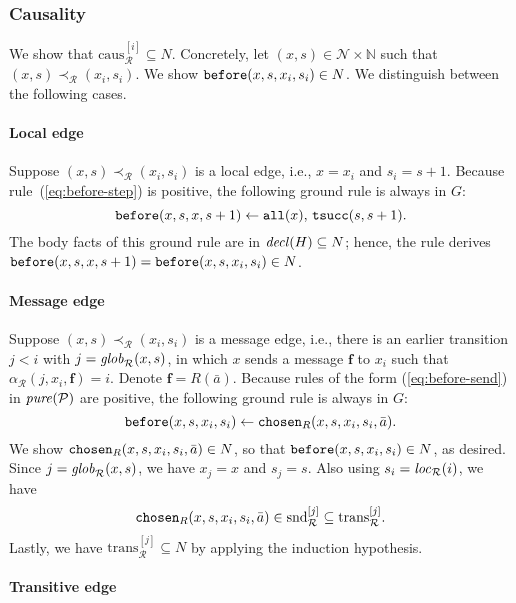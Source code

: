 \documentclass{tlp}
\newcommand{\Nat}{\mathbb{N}}  \newcommand{\len}[1]{|#1|} \newcommand{\rom}[1]{\text{\emph{(#1)}}} \newcommand{\romI}{\rom i}
\newcommand{\ded}{\mathcal{P}}
\newcommand{\fc}{\boldsymbol{f}}
\newcommand{\nw}{\mathcal{N}}
\newcommand{\timesucc}{\pred{tsucc}}
\newcommand{\relall}{\pred{all}}
\newcommand{\before}{\pred{before}}
\newcommand{\chosen}{\pred{chosen}}
\newcommand{\decl}[1]{\fname{decl}(#1)}
\newcommand{\pure}[1]{\fname{pure}(#1)}
\newcommand{\run}{\mathcal{R}}
\newcommand{\locR}[1]{\fname{loc}_{\run}(#1)}
\newcommand{\globR}[1]{\fname{glob}_{\run}(#1)}
\newcommand{\nwnat}{\nw\times\Nat}
\newcommand{\arr}{\alpha_{\run}}
\newcommand{\slice}[1]{\mathrm{trans}_{\run}^{[#1]}}
\newcommand{\slicesnd}[1]{\text{snd}_{\run}^{[#1]}}
\newcommand{\slicecaus}[1]{\text{caus}_{\run}^{[#1]}}
\newcommand{\caus}{\prec_{\run}}
\newcommand{\grded}{G}
\begin{document}
\begin{appendix}
\subsubsection{Causality}

We show that $\slicecaus i\subseteq N$. Concretely, let $(x,s)\in\nwnat$
such that $(x,s)\caus(x_{i},s_{i})$. We show $\before(x,s,x_{i},s_{i})\in N$.
We distinguish between the following cases.


\paragraph*{Local edge}

Suppose $(x,s)\caus(x_{i},s_{i})$ is a local edge, i.e., $x=x_{i}$
and $s_{i}=s+1$. Because rule~(\ref{eq:before-step}) is positive,
the following ground rule is always in $\grded$:
\[
\before(x,s,x,s+1)\gets\relall(x),\,\timesucc(s,s+1).
\]
The body facts of this ground rule are in $\decl H\subseteq N$; hence,
the rule derives $\before(x,s,x,s+1)=\before(x,s,x_{i},s_{i})\in N$.


\paragraph*{Message edge}

Suppose $(x,s)\caus(x_{i},s_{i})$ is a message edge, i.e., there
is an earlier transition $j<i$ with $j=\globR{x,s}$, in which $x$
sends a message $\fc$ to $x_{i}$ such that $\arr(j,x_{i},\fc)=i$.
Denote $\fc=R(\bar{a})$. Because rules of the form (\ref{eq:before-send})
in $\pure{\ded}$ are positive, the following ground rule is always
in $\grded$:
\[
\before(x,s,x_{i},s_{i})\gets\chosen_{R}(x,s,x_{i},s_{i},\bar{a}).
\]
We show $\chosen_{R}(x,s,x_{i},s_{i},\bar{a})\in N$, so that $\before(x,s,x_{i},s_{i})\in N$,
as desired. Since $j=\globR{x,s}$, we have $x_{j}=x$ and $s_{j}=s$.
Also using $s_{i}=\locR i$, we have
\[
\chosen_{R}(x,s,x_{i},s_{i},\bar{a})\in\slicesnd j\subseteq\slice j.
\]
Lastly, we have $\slice j\subseteq N$ by applying the induction hypothesis.


\paragraph*{Transitive edge}


\end{appendix}
\end{document}
